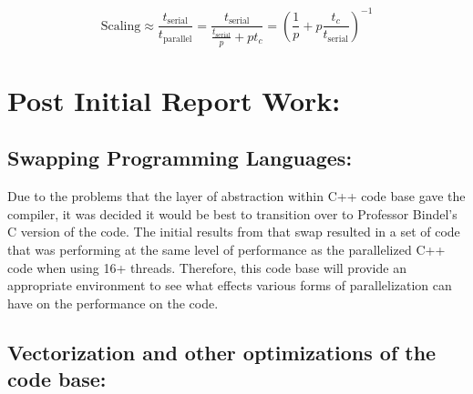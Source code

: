 \documentclass[12pt]{article}
\begin{document}
\begin{equation}
\mathrm{Scaling} \approx \frac{t_{\mathrm{serial}}}{t_{\mathrm{parallel}}} = \frac{t_{\mathrm{serial}}}{\frac{t_{\mathrm{serial}}}{p} + p t_c} = \left (\frac{1}{p}+p \frac{t_c}{t_{\mathrm{serial}}} \right)^{-1}
\label{exps}
\end{equation}

\section{Post Initial Report Work:}

\subsection{Swapping Programming Languages:}

Due to the problems that the layer of abstraction within C++ code base gave the compiler, it was decided it would be best to transition over to Professor Bindel's C version of the code. The initial results from that swap resulted in a set of code that was performing at the same level of performance as the parallelized C++ code when using 16+ threads.  Therefore, this code base will provide an appropriate environment to see what effects various forms of parallelization can have on the performance on the code.

\subsection{Vectorization and other optimizations of the code base:}
\end{document}
